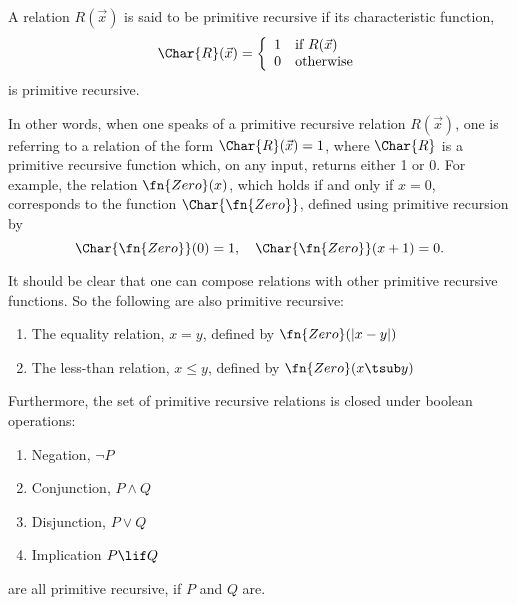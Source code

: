 \documentclass[../../include/open-logic-section]{subfiles}
\begin{document}
\begin{defn}
A relation $R(\vec x)$ is said to be primitive recursive if its characteristic
function,
\[
\Char{R}(\vec x) = \left\{
  \begin{array}{ll}
  1 & \mbox{if $R(\vec x)$} \\
  0 & \mbox{otherwise} 
  \end{array}
\right.
\]
is primitive recursive. 
\end{defn}

In other words, when one speaks of a primitive
recursive relation $R(\vec x)$, one is referring to a relation of the
form $\Char{R}(\vec x) = 1$, where $\Char{R}$ is a primitive recursive
function which, on any input, returns either 1 or 0. For example, the
relation $\fn{Zero}(x)$, which holds if and only if $x = 0$,
corresponds to the function $\Char{\fn{Zero}}$, defined using primitive
recursion by 
\[
\Char{\fn{Zero}}(0) = 1, \quad \Char{\fn{Zero}}(x+1) = 0.
\]

It should be clear that one can compose relations with other primitive
recursive functions. So the following are also primitive recursive:
\begin{enumerate}
\item The equality relation, $x = y$, defined by $\fn{Zero}(\left|x -
  y\right|)$
\item The less-than relation, $x \leq y$, defined by $\fn{Zero}(x
  \tsub y)$
\end{enumerate}
Furthermore, the set of primitive recursive relations is closed under
boolean operations:
\begin{enumerate}
\item Negation, $\lnot P$
\item Conjunction, $P \land Q$
\item Disjunction, $P \lor Q$
\item Implication $P \lif Q$
\end{enumerate}
are all primitive recursive, if $P$ and $Q$ are.
\end{document}

